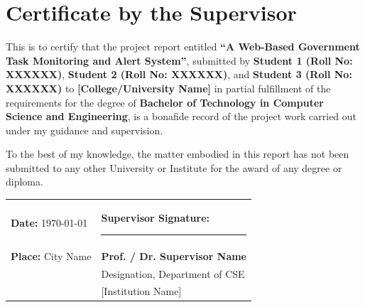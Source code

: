 \chapter*{Certificate by the Supervisor}

This is to certify that the project report entitled \textbf{``A Web-Based Government Task Monitoring and Alert System''}, submitted by \textbf{Student 1 (Roll No: XXXXXX)}, \textbf{Student 2 (Roll No: XXXXXX)}, and \textbf{Student 3 (Roll No: XXXXXX)} to \textbf{[College/University Name]} in partial fulfillment of the requirements for the degree of \textbf{Bachelor of Technology in Computer Science and Engineering}, is a bonafide record of the project work carried out under my guidance and supervision.

To the best of my knowledge, the matter embodied in this report has not been submitted to any other University or Institute for the award of any degree or diploma.

\vspace{3cm}

\noindent
\begin{tabular}{@{}p{8cm}p{7cm}@{}}
    \textbf{Date:} \today & \textbf{Supervisor Signature:} \rule{4cm}{0.4pt} \\
    \textbf{Place:} City Name & \textbf{Prof. / Dr. Supervisor Name} \\
    & Designation, Department of CSE \\
    & [Institution Name] \\
\end{tabular}

\clearpage

